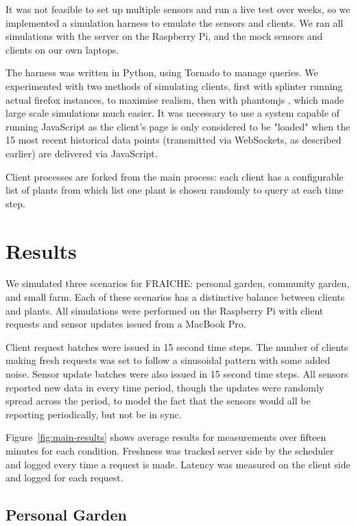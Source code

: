 \documentclass[a4paper]{acm_proc_article-sp}
\begin{document}
It was not feasible to set up multiple sensors and run a live test over weeks, so we implemented a simulation harness to emulate the sensors and clients.  We ran all simulations with the server on the Raspberry Pi, and the mock sensors and clients on our own laptops. 

The harness was written in Python, using Tornado to manage queries.  We experimented with two methods of simulating clients, first with splinter \cite{Splinter} running actual firefox instances, to maximise realism, then with phantomjs \cite{phantomjs}, which made large scale simulations much easier.  It was necessary to use a system capable of running JavaScript as the client's page is only considered to be "loaded" when the 15 most recent historical data points (transmitted via WebSockets, as described earlier) are delivered via JavaScript.

Client processes are forked from the main process: each client has a configurable list of plants from which list one plant is chosen randomly to query at each time step.  

\section{Results}

We simulated three scenarios for FRAICHE: personal garden, community garden, and small farm.  Each of these scenarios has a distinctive balance between clients and plants.  All simulations were performed on the Raspberry Pi with client requests and sensor updates issued from a MacBook Pro.

Client request batches were issued in 15 second time steps.  The number of clients making fresh requests was set to follow a sinusoidal pattern with some added noise.  Sensor update batches were also issued in 15 second time steps.  All sensors reported new data in every time period, though the updates were randomly spread across the period, to model the fact that the sensors would all be reporting periodically, but not be in sync.

Figure~\ref{fig:main-results} shows average results for measurements over fifteen minutes for each condition.  Freshness was tracked server side by the scheduler and logged every time a request is made.  Latency was measured on the client side and logged for each request.

\subsection{Personal Garden}
\end{document}
